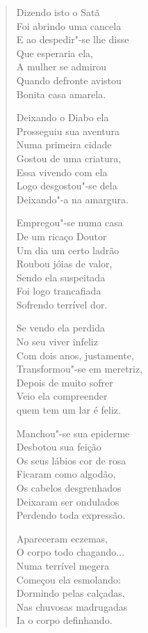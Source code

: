 \begin{verse}
Dizendo isto o Satã \\
Foi abrindo uma cancela \\
E ao despedir"-se lhe disse \\
Que esperaria ela, \\
A mulher se admirou \\
Quando defronte avistou \\
Bonita casa amarela. 
\pagebreak

Deixando o Diabo ela \\
Prosseguiu sua aventura \\
Numa primeira cidade \\
Gostou de uma criatura, \\
Essa vivendo com ela \\
Logo desgostou"-se dela \\
Deixando"-a na amargura. 

Empregou"-se numa casa \\
De um ricaço Doutor \\
Um dia um certo ladrão \\
Roubou jóias de valor, \\
Sendo ela suspeitada \\
Foi logo trancafiada \\
Sofrendo terrível dor. 

Se vendo ela perdida \\
No seu viver infeliz \\
Com dois anos, justamente, \\
Transformou"-se em meretriz, \\
Depois de muito sofrer \\
Veio ela compreender \\
quem tem um lar é feliz. 

Manchou"-se sua epiderme \\
Desbotou sua feição \\
Os seus lábios cor de rosa \\
Ficaram como algodão, \\
Os cabelos desgrenhados \\
Deixaram ser ondulados \\
Perdendo toda expressão. 
\pagebreak

Apareceram eczemas, \\
O corpo todo chagando... \\
Numa terrível megera \\
Começou ela esmolando: \\
Dormindo pelas calçadas, \\
Nas chuvosas madrugadas \\
Ia o corpo definhando. 


\end{verse}

